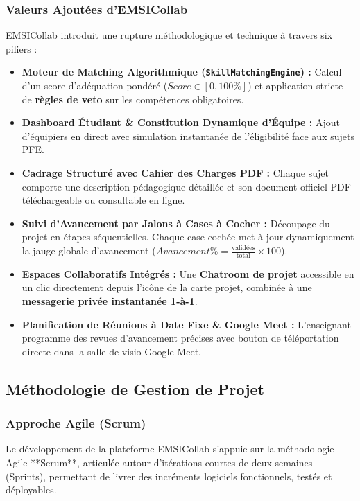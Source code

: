 \documentclass[11pt,a4paper,titlepage]{article}
\begin{document}
\subsubsection{Valeurs Ajoutées d'EMSICollab}
EMSICollab introduit une rupture méthodologique et technique à travers six piliers :
\begin{itemize}[leftmargin=1.5cm]
    \item \textbf{Moteur de Matching Algorithmique (\texttt{SkillMatchingEngine}) :} Calcul d'un score d'adéquation pondéré ($Score \in [0, 100\%]$) et application stricte de \textbf{règles de veto} sur les compétences obligatoires.
    \item \textbf{Dashboard Étudiant \& Constitution Dynamique d'Équipe :} Ajout d'équipiers en direct avec simulation instantanée de l'éligibilité face aux sujets PFE.
    \item \textbf{Cadrage Structuré avec Cahier des Charges PDF :} Chaque sujet comporte une description pédagogique détaillée et son document officiel PDF téléchargeable ou consultable en ligne.
    \item \textbf{Suivi d'Avancement par Jalons à Cases à Cocher :} Découpage du projet en étapes séquentielles. Chaque case cochée met à jour dynamiquement la jauge globale d'avancement ($Avancement\% = \frac{\text{validées}}{\text{total}} \times 100$).
    \item \textbf{Espaces Collaboratifs Intégrés :} Une \textbf{Chatroom de projet} accessible en un clic directement depuis l'icône de la carte projet, combinée à une \textbf{messagerie privée instantanée 1-à-1}.
    \item \textbf{Planification de Réunions à Date Fixe \& Google Meet :} L'enseignant programme des revues d'avancement précises avec bouton de téléportation directe dans la salle de visio Google Meet.
\end{itemize}

\newpage
\subsection{Méthodologie de Gestion de Projet}

\subsubsection{Approche Agile (Scrum)}
Le développement de la plateforme EMSICollab s'appuie sur la méthodologie Agile **Scrum**, articulée autour d'itérations courtes de deux semaines (Sprints), permettant de livrer des incréments logiciels fonctionnels, testés et déployables.
\end{document}
